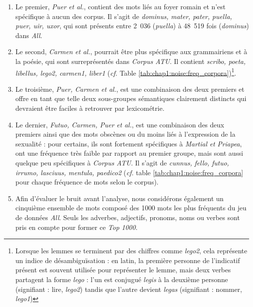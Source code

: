 \begin{enumerate}
    \item Le premier, \textit{Puer et al.}, contient des mots liés au foyer romain et n'est spécifique à aucun des corpus. Il s'agit de \textit{dominus, mater, pater, puella, puer, uir, uxor}, qui sont présents entre 2~036 (\textit{puella}) à 48~519 fois (\textit{dominus}) dans \textit{All}.
    \item Le second, \textit{Carmen et al.}, pourrait être plus spécifique aux grammairiens et à la poésie, qui sont surreprésentés dans \textit{Corpus ATU}. Il contient \textit{scribo, poeta, libellus, lego2, carmen1, liber1} (\textit{cf. } Table \ref{tab:chap1:noise:freq_corpora})\footnote{Lorsque les lemmes se terminent par des chiffres comme \textit{lego2}, cela représente un indice de désambiguïsation : en latin, la première personne de l'indicatif présent est souvent utilisée pour représenter le lemme, mais deux verbes partagent la forme \textit{lego} : l'un est conjugué \textit{legis} à la deuxième personne (signifiant : lire, \textit{lego2}) tandis que l'autre devient \textit{legas} (signifiant : nommer, \textit{lego1})}. 
    \item Le troisième, \textit{Puer, Carmen et al.}, est une combinaison des deux premiers et offre en tant que telle deux sous-groupes sémantiques clairement distincts qui devraient être faciles à retrouver par lexicométrie.
    \item Le dernier, \textit{Futuo, Carmen, Puer et al.}, est une combinaison des deux premiers ainsi que des mots obscènes ou du moins liés à l'expression de la sexualité : pour certains, ils sont fortement spécifiques à \textit{Martial et Priapea}, ont une fréquence très faible par rapport au premier groupe, mais sont aussi quelque peu spécifiques à \textit{Corpus ATU}. Il s'agit de \textit{cunnus, fello, futuo, irrumo, lasciuus, mentula, paedico2} (\textit{cf.} table \ref{tab:chap1:noise:freq_corpora} pour chaque fréquence de mots selon le corpus).
    \item Afin d'évaluer le bruit avant l'analyse, nous considérons également un cinquième ensemble de mots composé des 1000 mots les plus fréquents du jeu de données \textit{All}. Seuls les adverbes, adjectifs, pronoms, noms ou verbes sont pris en compte pour former ce \textit{Top 1000}.
\end{enumerate}


